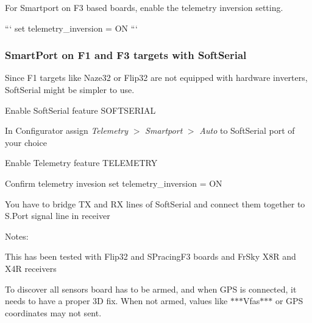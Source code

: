 For Smartport on F3 based boards, enable the telemetry inversion setting.

``` set telemetry\+\_\+inversion = O\+N ```

\subsubsection*{Smart\+Port on F1 and F3 targets with Soft\+Serial}

Since F1 targets like Naze32 or Flip32 are not equipped with hardware inverters, Soft\+Serial might be simpler to use.


\begin{DoxyEnumerate}
\item Enable Soft\+Serial {\ttfamily feature S\+O\+F\+T\+S\+E\+R\+I\+A\+L}
\item In Configurator assign {\itshape Telemetry} $>$ {\itshape Smartport} $>$ {\itshape Auto} to Soft\+Serial port of your choice
\item Enable Telemetry {\ttfamily feature T\+E\+L\+E\+M\+E\+T\+R\+Y}
\item Confirm telemetry invesion {\ttfamily set telemetry\+\_\+inversion = O\+N}
\item You have to bridge T\+X and R\+X lines of Soft\+Serial and connect them together to S.\+Port signal line in receiver
\end{DoxyEnumerate}

Notes\+:


\begin{DoxyItemize}
\item This has been tested with Flip32 and S\+Pracing\+F3 boards and Fr\+Sky X8\+R and X4\+R receivers
\item To discover all sensors board has to be armed, and when G\+P\+S is connected, it needs to have a proper 3\+D fix. When not armed, values like $\ast$$\ast$$\ast$\+Vfas$\ast$$\ast$$\ast$ or G\+P\+S coordinates may not sent. 
\end{DoxyItemize}